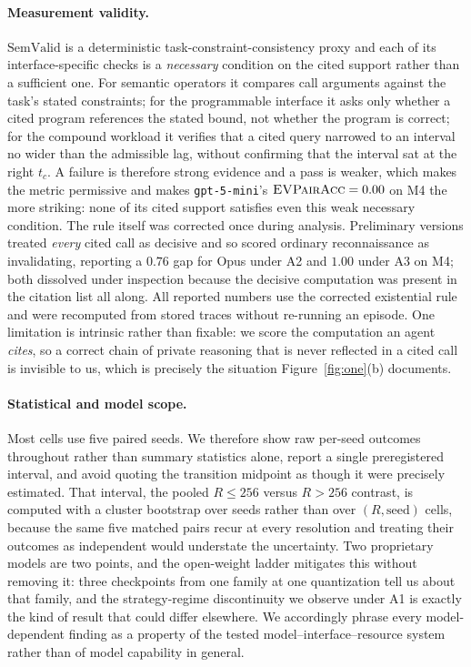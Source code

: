 \documentclass[sigconf,anonymous,review]{acmart}
\newcommand{\evpair}{\textsc{EVPairAcc}}
\begin{document}
\paragraph{Measurement validity.}
$\mathrm{SemValid}$ is a deterministic task-constraint-consistency proxy and each of its
interface-specific checks is a \emph{necessary} condition on the cited support rather than a
sufficient one. For semantic operators it compares call arguments against the task's stated
constraints; for the programmable interface it asks only whether a cited program references the
stated bound, not whether the program is correct; for the compound workload it verifies that a
cited query narrowed to an interval no wider than the admissible lag, without confirming that the
interval sat at the right $t_c$. A failure is therefore strong evidence and a pass is weaker, which
makes the metric permissive and makes \texttt{gpt-5-mini}'s $\evpair=0.00$ on M4 the more striking:
none of its cited support satisfies even this weak necessary condition. The rule itself was
corrected once during analysis. Preliminary versions treated \emph{every} cited call as decisive
and so scored ordinary reconnaissance as invalidating, reporting a $0.76$ gap for Opus under A2 and
$1.00$ under A3 on M4; both dissolved under inspection because the decisive computation was present
in the citation list all along. All reported numbers use the corrected existential rule and were
recomputed from stored traces without re-running an episode. One limitation is intrinsic rather
than fixable: we score the computation an agent \emph{cites}, so a correct chain of private
reasoning that is never reflected in a cited call is invisible to us, which is precisely the
situation Figure~\ref{fig:one}(b) documents.

\paragraph{Statistical and model scope.}
Most cells use five paired seeds. We therefore show raw per-seed outcomes throughout rather than
summary statistics alone, report a single preregistered interval, and avoid quoting the transition
midpoint as though it were precisely estimated. That interval, the pooled $R\le256$ versus $R>256$
contrast, is computed with a cluster bootstrap over seeds rather than over $(R,\text{seed})$ cells,
because the same five matched pairs recur at every resolution and treating their outcomes as
independent would understate the uncertainty. Two proprietary models are two points, and the
open-weight ladder mitigates this without removing it: three checkpoints from one family at one
quantization tell us about that family, and the strategy-regime discontinuity we observe under A1
is exactly the kind of result that could differ elsewhere. We accordingly phrase every
model-dependent finding as a property of the tested model--interface--resource system rather than
of model capability in general.
\end{document}
